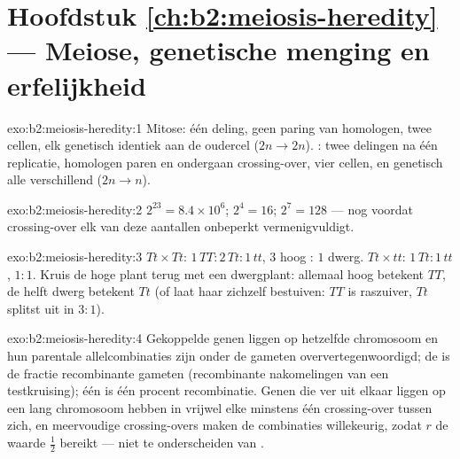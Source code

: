 \section*{Hoofdstuk \ref{ch:b2:meiosis-heredity} --- Meiose, genetische menging en erfelijkheid}

\begin{solution}{exo:b2:meiosis-heredity:1}
Mitose: één deling, geen paring van homologen, twee cellen, elk
genetisch identiek aan de oudercel ($2n \to 2n$). : twee delingen
na één replicatie, homologen paren en ondergaan crossing-over, vier
cellen,  en genetisch alle verschillend ($2n \to n$).
\end{solution}

\begin{solution}{exo:b2:meiosis-heredity:2}
$2^{23} = 8.4\times 10^{6}$; $2^{4} = 16$; $2^{7} = 128$ --- nog voordat
crossing-over elk van deze aantallen onbeperkt vermenigvuldigt.
\end{solution}

\begin{solution}{exo:b2:meiosis-heredity:3}
$Tt\times Tt$:  $1\,TT : 2\,Tt : 1\,tt$,  $3$ hoog
: $1$ dwerg. $Tt\times tt$: $1\,Tt : 1\,tt$, $1 : 1$. Kruis de hoge
plant terug met een dwergplant: allemaal hoog betekent $TT$, de helft
dwerg betekent $Tt$ (of laat haar zichzelf bestuiven: $TT$ is raszuiver,
$Tt$ splitst uit in $3 : 1$).
\end{solution}

\begin{solution}{exo:b2:meiosis-heredity:4}
Gekoppelde genen liggen op hetzelfde chromosoom en hun parentale
allelcombinaties zijn onder de gameten oververtegenwoordigd; de
 is de fractie recombinante gameten (recombinante
nakomelingen van een testkruising); één  is één procent
recombinatie. Genen die ver uit elkaar liggen op een lang chromosoom
hebben in vrijwel elke  minstens één crossing-over tussen zich, en
meervoudige crossing-overs maken de combinaties willekeurig, zodat $r$
de waarde $\tfrac12$ bereikt --- niet te onderscheiden van .
\end{solution}


